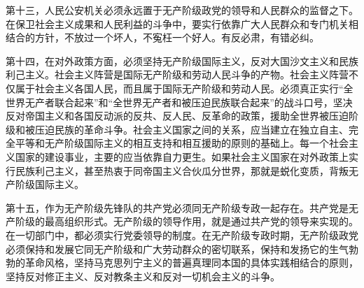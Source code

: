 第十三，人民公安机关必须永远置于无产阶级政党的领导和人民群众的监督之下。在保卫社会主义成果和人民利益的斗争中，要实行依靠广大人民群众和专门机关相结合的方针，不放过一个坏人，不寃枉一个好人。有反必肃，有错必纠。

第十四，在对外政策方面，必须坚持无产阶级国际主义，反对大国沙文主义和民族利己主义。社会主义阵营是国际无产阶级和劳动人民斗争的产物。社会主义阵营不仅属于社会主义各国人民，而且属于国际无产阶级和劳动人民。必须真正实行“全世界无产者联合起来”和“全世界无产者和被压迫民族联合起来”的战斗口号，坚决反对帝国主义和各国反动派的反共、反人民、反革命的政策，援助全世界被压迫阶级和被压迫民族的革命斗争。社会主义国家之间的关系，应当建立在独立自主、完全平等和无产阶级国际主义的相互支持和相互援助的原则的基础上。每一个社会主义国家的建设事业，主要的应当依靠自力更生。如果社会主义国家在对外政策上实行民族利己主义，甚至热衷于同帝国主义合伙瓜分世界，那就是蜕化变质，背叛无产阶级国际主义。

第十五，作为无产阶级先锋队的共产党必须同无产阶级专政一起存在。共产党是无产阶级的最高组织形式。无产阶级的领导作用，就是通过共产党的领导来实现的。在一切部门中，都必须实行党委领导的制度。在无产阶级专政时期，无产阶级政党必须保持和发展它同无产阶级和广大劳动群众的密切联系，保持和发扬它的生气勃勃的革命风格，坚持马克思列宁主义的普遍真理同本国的具体实践相结合的原则，坚持反对修正主义、反对教条主义和反对一切机会主义的斗争。

